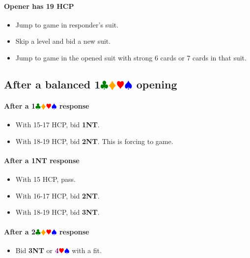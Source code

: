 \documentclass{article}
\newcommand{\Hs}{\textcolor{Red}{$\varheart$}}
\newcommand{\Ss}{\textcolor{Blue}{$\spadesuit$}}
\newcommand{\Ds}{\textcolor{Orange}{$\vardiamond$}}
\newcommand{\Cs}{\textcolor{Green}{$\clubsuit$}}
\newcommand{\NTs}{\textbf{\footnotesize{NT}}}
\newcommand{\NT}[1]{\textbf{#1\NTs}}
\newcommand{\suits}[1]{\textbf{#1}\Cs\Ds\Hs\Ss}
\newcommand{\majors}[1]{\textcolor{Purple}{\textbf{#1}}\Hs\Ss}
\begin{document}
\paragraph{Opener has 19 HCP}

\begin{itemize}
\item Jump to game in responder's suit.
\item Skip a level and bid a new suit.
\item Jump to game in the opened suit with strong 6 cards or 7 cards in that suit.
\end{itemize}

\subsection{After a balanced \suits{1} opening}


\paragraph{After a \suits{1} response}

\begin{itemize}
\item With 15-17 HCP, bid \NT{1}.
\item With 18-19 HCP, bid \NT{2}. This is forcing to game.
\end{itemize}

\paragraph{After a \NT{1} response}

\begin{itemize}
\item With 15 HCP, pass.
\item With 16-17 HCP, bid \NT{2}.
\item With 18-19 HCP, bid \NT{3}.
\end{itemize}

\paragraph{After a \suits{2} response}

\begin{itemize}
\item Bid \NT{3} or \majors{4} with a fit.
\end{itemize}
\end{document}
